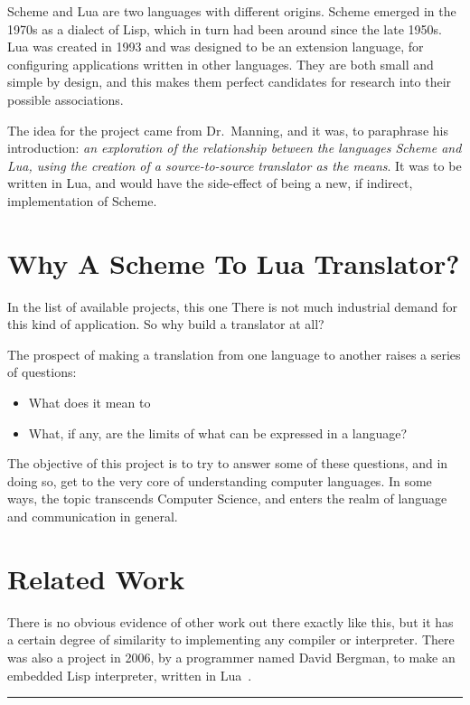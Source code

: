 Scheme and Lua are two languages with different origins. Scheme emerged in the
1970s as a dialect of Lisp, which in turn had been around since the late 1950s.
Lua was created in 1993 and was designed to be an extension language, for
configuring applications written in other languages. They are both small and
simple by design, and this makes them perfect candidates for research into their
possible associations.

The idea for the project came from Dr.\ Manning, and it was, to paraphrase his
introduction: {\em an exploration of the relationship between the languages
Scheme and Lua, using the creation of a source-to-source translator as the
means}. It was to be written in Lua, and would have the side-effect of being a
new, if indirect, implementation of Scheme.


\section{Why A Scheme To Lua Translator?}

In the list of available projects, this one There is not much industrial demand
for this kind of application. So why build a translator at all?

The prospect of making a translation from one language to another raises a series of questions:
\begin{itemize}
\item What does it mean to 
\item What, if any, are the limits of what can be expressed in a language?
\end{itemize}
The objective of this project is to try to answer some of these questions, and
in doing so, get to the very core of understanding computer languages. In
some ways, the topic transcends Computer Science, and enters the realm of
language and communication in general.

\section{Related Work}

There is no obvious evidence of other work out there exactly like this, but it
has a certain degree of similarity to implementing any compiler or interpreter.
There was also a project in 2006, by a programmer named David Bergman, to make
an embedded Lisp interpreter, written in Lua~\cite{lualisp}. \\[5mm]

\hrule \hfill \\[5mm]

